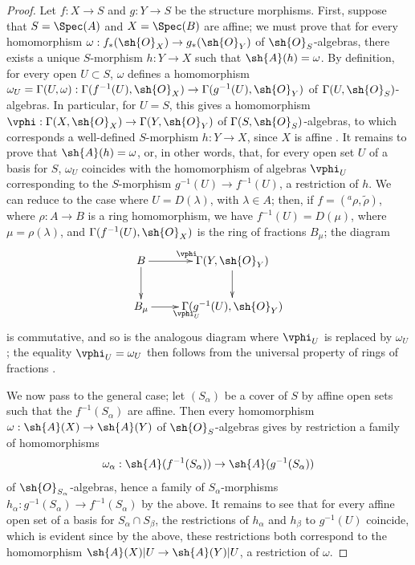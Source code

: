 \begin{proof}
Let $f:X\to S$ and $g:Y\to S$ be the structure morphisms.
First, suppose that $S=\Spec(A)$ and $X=\Spec(B)$ are affine; we must prove that for every homomorphism $\omega:f_*(\sh{O}_X)\to g_*(\sh{O}_Y)$ of $\sh{O}_S$-algebras, there exists a unique $S$-morphism $h:Y\to X$ such that $\sh{A}(h)=\omega$.
By definition, for every open $U\subset S$, $\omega$ defines a homomorphism $\omega_U=\Gamma(U,\omega):\Gamma(f^{-1}(U),\sh{O}_X)\to\Gamma(g^{-1}(U),\sh{O}_Y)$ of $\Gamma(U,\sh{O}_S)$-algebras.
In particular, for $U=S$, this gives a homomorphism $\vphi:\Gamma(X,\sh{O}_X)\to\Gamma(Y,\sh{O}_Y)$ of $\Gamma(S,\sh{O}_S)$-algebras, to which corresponds a well-defined $S$-morphism $h:Y\to X$, since $X$ is affine .
It remains to prove that $\sh{A}(h)=\omega$, or, in other words, that, for every open set $U$ of a basis for $S$, $\omega_U$ coincides with the homomorphism of algebras $\vphi_U$ corresponding to the $S$-morphism $g^{-1}(U)\to f^{-1}(U)$, a restriction of $h$.
We can reduce to the case where $U=D(\lambda)$, with $\lambda\in A$; then, if $f=({}^a\rho,\widetilde{\rho})$, where $\rho:A\to B$ is a ring homomorphism, we have $f^{-1}(U)=D(\mu)$, where $\mu=\rho(\lambda)$, and $\Gamma(f^{-1}(U),\sh{O}_X)$ is the ring of fractions $B_\mu$; the diagram
\[
  \xymatrix{
    B\ar[r]^\vphi\ar[d] &
    \Gamma(Y,\sh{O}_Y)\ar[d]\\
    B_\mu\ar[r]_{\vphi_U} &
    \Gamma(g^{-1}(U),\sh{O}_Y)
  }
\]
is commutative, and so is the analogous diagram where $\vphi_U$ is replaced by $\omega_U$; the equality $\vphi_U=\omega_U$ then follows from the universal property of rings of fractions .

We now pass to the general case; let $(S_\alpha)$ be a cover of $S$ by affine open sets
such that the $f^{-1}(S_\alpha)$ are affine.
Then every homomorphism $\omega:\sh{A}(X)\to\sh{A}(Y)$ of $\sh{O}_S$-algebras gives by restriction a family of homomorphisms
\[
  \omega_\alpha:\sh{A}(f^{-1}(S_\alpha))\to\sh{A}(g^{-1}(S_\alpha))
\]
of $\sh{O}_{S_\alpha}$-algebras, hence a family of $S_\alpha$-morphisms $h_\alpha:g^{-1}(S_\alpha)\to f^{-1}(S_\alpha)$ by the above.
It remains to see that for every affine open set of a basis for $S_\alpha\cap S_\beta$, the restrictions of $h_\alpha$ and $h_\beta$ to $g^{-1}(U)$ coincide, which is evident since by the above, these restrictions both correspond to the homomorphism $\sh{A}(X)|U\to\sh{A}(Y)|U$, a restriction of $\omega$.
\end{proof}

